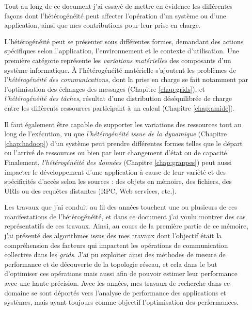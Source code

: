 
Tout au long de ce document j'ai essayé de mettre en évidence les différentes façons dont l'hétérogénéité peut affecter l'opération d'un système ou d'une application, ainsi que mes contributions pour leur prise en charge.

L'hétérogénéité peut se présenter sous différentes formes, demandant des actions spécifiques selon l'application, l'environnement et le contexte d'utilisation. Une première catégorie représente les \textit{variations matérielles} des composants d'un système informatique. À l'hétérogénéité matérielle s'ajoutent les problèmes de l'\textit{hétérogénéité des communications}, dont la prise en charge se fait notamment par l'optimisation des échanges des messages (Chapitre \ref{chap:grids}), et \textit{l'hétérogénéité des tâches}, résultat d'une distribution déséquilibrée de charge entre les différents ressources participant à un calcul (Chapitre \ref{chap:amide}). 

Il faut également être capable de supporter les variations des ressources tout au long de l'exécution, vu que \textit{l'hétérogénéité issue de la dynamique} (Chapitre \ref{chap:hadoop}) d'un système peut prendre différentes formes telles que le départ ou l'arrivé de ressources ou bien par leur changement d'état ou de capacité. Finalement, \textit{l'hétérogénéité des données} (Chapitre \ref{chap:grappes}) peut aussi impacter le développement d'une application à cause de leur variété et des spécificités d'accès selon les sources : des objets en mémoire, des fichiers, des URIs ou des requêtes distantes (RPC, Web services, etc.). 

Les travaux que j'ai conduit au fil des années touchent une ou plusieurs de ces manifestations de l'hétérogénéité, et dans ce document j'ai voulu montrer des cas représentatifs de ces travaux. Ainsi, au cours de la première partie de ce mémoire, j'ai présenté des algorithmes issus des mes travaux dont l'objectif était la compréhension des facteurs qui impactent les opérations de communication collective dans les \textit{grids}. J'ai pu exploiter ainsi des méthodes de mesure de performance et de découverte de la topologie réseau, et cela dans le but d'optimiser ces opérations mais aussi afin de pouvoir estimer leur performance avec une haute précision. Avec les années, mes travaux de recherche dans ce domaine se sont déportés vers l'analyse de performance des applications et systèmes, mais ayant toujours comme objectif l'optimisation des performances.

